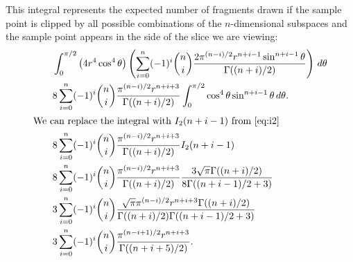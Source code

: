 \begin{lem}

This integral represents the expected number of fragments drawn if the sample
point is clipped by all possible combinations of the $n$-dimensional 
subspaces and the sample point appears in the side of the slice we are 
viewing:
\begin{align*}
  \qquad & \int_{0}^{\pi/2}
           \left(4r^4 \cos^4 \theta\right)
           \left(
             \sum_{i=0}^{n} (-1)^i {n \choose i}
                            \frac{2\pi^{(n-i)/2} r^{n+i-1} \sin^{n+i-1} \theta}
                                 {\Gamma((n+i)/2)} 
           \right) \, d\theta \\
  \qquad & 8 \sum_{i=0}^{n} (-1)^i {n \choose i}
                 \frac{\pi^{(n-i)/2} r^{n+i+3}}{\Gamma((n+i)/2)} 
           \int_{0}^{\pi/2} \cos^4 \theta \sin^{n+i-1} \theta \, d\theta \text{.} \\
\intertext{We can replace the integral with $I_2(n+i-1)$ from \autoref{eq:i2}}
  \qquad & 8 \sum_{i=0}^{n} (-1)^i {n \choose i}
                 \frac{\pi^{(n-i)/2} r^{n+i+3}}{\Gamma((n+i)/2)} 
           I_2(n+i-1) \\
  \qquad & 8 \sum_{i=0}^{n} (-1)^i {n \choose i}
                 \frac{\pi^{(n-i)/2} r^{n+i+3}}{\Gamma((n+i)/2)} 
           \frac{3\sqrt{\pi} \Gamma((n+i)/2)}{8\Gamma((n+i-1)/2+3)} \\
  \qquad & 3 \sum_{i=0}^{n}(-1)^i {n \choose i}
             \frac{\sqrt{\pi}\pi^{(n-i)/2} r^{n+i+3} \Gamma((n+i)/2)}
                  {\Gamma((n+i)/2) \Gamma((n+i-1)/2+3)} \\
  \qquad & 3 \sum_{i=0}^{n} (-1)^i {n \choose i}
             \frac{\pi^{(n-i+1)/2} r^{n+i+3}}
                  {\Gamma((n+i+5)/2)}
\text{.}
\end{align*}
\end{lem}

